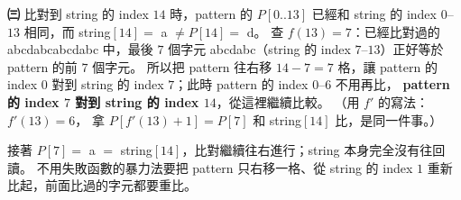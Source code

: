 \begin{pastsoln}
\textbf{㈢} 比對到 string 的 index $14$ 時，pattern 的 $P[0..13]$ 已經和 string 的 index $0$--$13$ 相同，而
string$[14] = $ a $\ne P[14] = $ d。 查 $f(13) = 7$：已經比對過的 abcdabcabcdabc 中，最後 $7$ 個字元
abcdabc（string 的 index $7$--$13$）正好等於 pattern 的前 $7$ 個字元。 所以把 pattern 往右移
$14 - 7 = 7$ 格，讓 pattern 的 index $0$ 對到 string 的 index $7$；此時 pattern 的 index $0$--$6$ 不用再比，
\textbf{pattern 的 index $7$ 對到 string 的 index $14$}，從這裡繼續比較。 （用 $f'$ 的寫法：$f'(13) = 6$，
拿 $P[f'(13) + 1] = P[7]$ 和 string$[14]$ 比，是同一件事。）

接著 $P[7] = $ a $=$ string$[14]$，比對繼續往右進行；string 本身完全沒有往回讀。 不用失敗函數的暴力法要把
pattern 只右移一格、從 string 的 index $1$ 重新比起，前面比過的字元都要重比。
\end{pastsoln}
